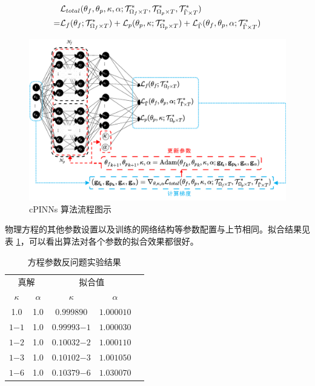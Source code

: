 \begin{equation}\label{eq:example_param_inverse}
    \begin{aligned}
        &\mathcal{L}_{total}({\theta_f,\theta_p,\kappa,\alpha};{\mathcal{T}_{{\Omega_f} \times T}^*,\mathcal{T}_{{\Omega_p} \times T}^*,\mathcal{T}_{{\tilde{\Gamma}} \times T}^*}) \\
        =& \mathcal{L}_{f}({\theta_f};{\mathcal{T}_{{\Omega_f} \times T}^*}) + \mathcal{L}_{p}({\theta_p, \kappa};{\mathcal{T}_{{\Omega_p} \times T}^*}) + \mathcal{L}_{\tilde{\Gamma}}({\theta_f,\theta_p, \alpha};{\mathcal{T}_{{\tilde{\Gamma}} \times T}^*})
    \end{aligned}
\end{equation}

\begin{figure}[H]
    \centering
    \includegraphics[width=1.0\linewidth]{images/参数反问题算法迁移图示.pdf}
    \caption{ cPINNs 算法流程图示 }
    \label{fig:param_inverse_cPINNs}
\end{figure}

物理方程的其他参数设置以及训练的网络结构等参数配置与上节相同。拟合结果见表 \ref{tab:example_param_inverse}，可以看出算法对各个参数的拟合效果都很好。

\begin{table}[H]
    \centering
    \caption{方程参数反问题实验结果}
    \begin{tabular}{ccccc}
        \toprule
        \multicolumn{2}{c}{真解} & \multicolumn{2}{c}{拟合值}\\ 
        \cmidrule(r){1-2} \cmidrule(r){3-4}
        $\kappa$ & $\alpha$ & $\kappa$ & $\alpha$ \\
        \midrule
        1.0   & 1.0 & $\num{0.99989}{0} $  & $\num{1.00001}{0}$ \\
        $\num{1}{-1}$ & 1.0 & $\num{0.99993}{-1}$  & $\num{1.00003}{0}$ \\
        $\num{1}{-2}$ & 1.0 & $\num{0.10032}{-2}$  & $\num{1.00011}{0}$ \\
        $\num{1}{-3}$ & 1.0 & $\num{0.10102}{-3}$  & $\num{1.00105}{0}$ \\
        $\num{1}{-6}$ & 1.0 & $\num{0.10379}{-6}$  & $\num{1.03007}{0}$ \\
        \bottomrule
    \end{tabular}
    \label{tab:example_param_inverse}
\end{table}



